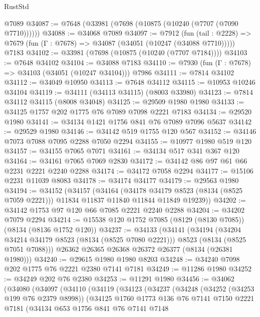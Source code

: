 \begin{lexlean}{RustStd}
\begin{coremodule}
    @7089
@34087 := @7648 (@33981 (@7698 (@10875 (@10240 (@7707 (@7090 @7710))))))
@34088 := @34068 @7089
@34097 := @7912
    (fun (tail : @2228) => @7679 (fun (Γ : @7678) => @34087 (@34051 (@10247 (@34088 @7710)))))
    @7183
@34102 := @33981 (@7698 (@10875 (@10240 (@7707 @7184))))
@34103 := @7648 @34102
@34104 := @34088 @7183
@34110 := @7930 (fun (Γ : @7678) => @34103 (@34051 (@10247 @34104))) @7986
@34111 := @7814 @34102
@34112 := @34049 @10950
@34113 := @7648 @34112
@34115 := @10953 @10246 @34104
@34119 := @34111 (@34113 @34115) (@8003 @33980)
@34123 := @7814 @34112 @34115 (@8008 @34048)
@34125 := @29509 @1980 @1980
@34133 := @34125 @1757 @202 @1775 @76 @7089 @7098 @2221 @7183
@34134 := @29520 @1980
@34141 := @34134 @1421 @1756 @841 @76 @7089 @7096 @5637
@34142 := @29529 @1980
@34146 := @34142 @519 @1755 @120 @567
@34152 := @34146 @7073 @7088 @7095 @2288 @7050 @2294
@34155 := @10977 @1980 @519 @120
@34157 := @34155 @7065 @7071
@34161 := @34134 @517 @341 @367 @120
@34164 := @34161 @7065 @7069 @2830
@34172 := @34142 @86 @97 @61 @66 @2231 @2221 @2240 @2288
@34174 := @34172 @7058 @2294
@34177 := @15106 @2231 @11039 @8083
@34178 := @34174 @34177
@34179 := @29563 @1980
@34194 := @34152
    (@34157
      (@34164
        (@34178 @34179 @8523 (@8134 (@8525 @7059 @2221)))
        @11834
        @11837
        @11840
        @11844
        @11849
        @19239))
@34202 := @34142 @1753 @97 @120 @66 @7085 @2221 @2240 @2288
@34204 := @34202 @7079 @2294
@34214 := @15538 @120 @1752 @7085 (@8129 (@8130 @7085)) (@8134 (@8136 @1752 @120))
@34237 := @34133
    (@34141
      (@34194
        (@34204 @34214 @34179 @8523 (@8134 (@8525 @7080 @2221)))
        @8523
        (@8134 (@8525 @7051 @7088)))
      @26362
      @26365
      @26368
      @26372
      @26377
      (@8134 (@26381 @1980)))
@34240 := @29615 @1980 @1980 @8203
@34248 := @34240 @7098 @202 @1775 @76 @2221 @2380 @7141 @7181
@34249 := @11286 @1980
@34252 := @34249 @202 @76 @2380
@34253 := @11291 @1980
@34456 := @34062
    (@34080
      (@34097
        (@34110
          (@34119
            (@34123
              (@34237
                (@34248
                  (@34252 (@34253 @199 @76 @2379 @8998))
                  (@34125
                    @1760
                    @1773
                    @136
                    @76
                    @7141
                    @7150
                    @2221
                    @7181
                    (@34134
                      @653
                      @1756
                      @841
                      @76
                      @7141
                      @7148

\end{coremodule}
\end{lexlean}

